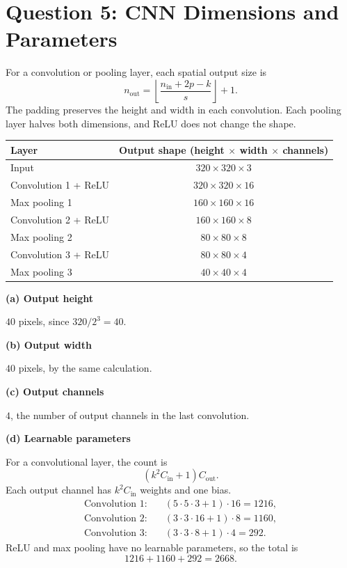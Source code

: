 \documentclass[11pt]{article}
\newcommand{\parttitle}[1]{\par\textbf{#1}\par}
\begin{document}
\newpage
\section*{Question 5: CNN Dimensions and Parameters}
For a convolution or pooling layer, each spatial output size is
\[
 n_{\mathrm{out}}=\left\lfloor\frac{n_{\mathrm{in}}+2p-k}{s}\right\rfloor+1.
\]
The padding preserves the height and width in each convolution.
Each pooling layer halves both dimensions, and ReLU does not change the shape.

\begin{center}
\begin{tabular}{lc}
\toprule
Layer & Output shape (height $\times$ width $\times$ channels) \\
\midrule
Input & $320\times320\times3$ \\
Convolution 1 + ReLU & $320\times320\times16$ \\
Max pooling 1 & $160\times160\times16$ \\
Convolution 2 + ReLU & $160\times160\times8$ \\
Max pooling 2 & $80\times80\times8$ \\
Convolution 3 + ReLU & $80\times80\times4$ \\
Max pooling 3 & $40\times40\times4$ \\
\bottomrule
\end{tabular}
\end{center}

\parttitle{(a) Output height}
$\boxed{40}$ pixels, since $320/2^3=40$.

\parttitle{(b) Output width}
$\boxed{40}$ pixels, by the same calculation.

\parttitle{(c) Output channels}
$\boxed{4}$, the number of output channels in the last convolution.

\parttitle{(d) Learnable parameters}
For a convolutional layer, the count is
\[
(k^2 C_{\mathrm{in}}+1)C_{\mathrm{out}}.
\]
Each output channel has $k^2 C_{\mathrm{in}}$ weights and one bias.
\begin{align*}
\text{Convolution 1:}&\quad (5\cdot5\cdot3+1)\cdot16=1216,\\
\text{Convolution 2:}&\quad (3\cdot3\cdot16+1)\cdot8=1160,\\
\text{Convolution 3:}&\quad (3\cdot3\cdot8+1)\cdot4=292.
\end{align*}
ReLU and max pooling have no learnable parameters, so the total is
\[
\boxed{1216+1160+292=2668}.
\]
\end{document}
